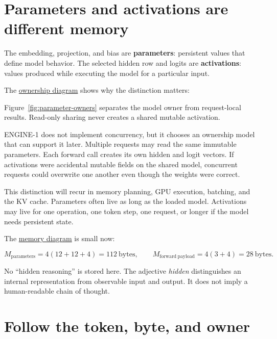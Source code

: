 \section{Parameters and activations are different
memory}\label{parameters-and-activations-are-different-memory}

The embedding, projection, and bias are \textbf{parameters}: persistent
values that define model behavior. The selected hidden row and logits
are \textbf{activations}: values produced while executing the model for
a particular input.

The
\href{https://github.com/hermonai/inside-the-llm-engine/blob/astra-visual-rewrite/diagrams/model/parameters-vs-activations.txt}{ownership
diagram} shows why the distinction matters:

Figure~\ref{fig:parameter-owners} separates the model owner from request-local results. Read-only sharing never creates a shared mutable activation.

ENGINE-1 does not implement concurrency, but it chooses an ownership
model that can support it later. Multiple requests may read the same
immutable parameters. Each forward call creates its own hidden and logit
vectors. If activations were accidental mutable fields on the shared
model, concurrent requests could overwrite one another even though the
weights were correct.

This distinction will recur in memory planning, GPU execution, batching,
and the KV cache. Parameters often live as long as the loaded model.
Activations may live for one operation, one token step, one request, or
longer if the model needs persistent state.

The
\href{https://github.com/hermonai/inside-the-llm-engine/blob/astra-visual-rewrite/diagrams/model/parameters-vs-activations.txt}{memory
diagram} is small now:

\begin{equation}M_{\mathrm{parameters}}=4(12+12+4)=112\ \mathrm{bytes},\qquad M_{\mathrm{forward\ payload}}=4(3+4)=28\ \mathrm{bytes}.\end{equation}

No ``hidden reasoning'' is stored here. The adjective \emph{hidden}
distinguishes an internal representation from observable input and
output. It does not imply a human-readable chain of thought.

\section{Follow the token, byte, and
owner}\label{follow-the-token-byte-and-owner}

